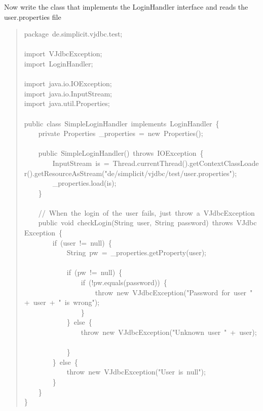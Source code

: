 \documentclass[10pt,a4paper,english]{article}
\begin{document}
Now write the class that implements the LoginHandler interface and reads the user.properties file
\begin{quote}{\ttfamily \raggedright \noindent
package~de.simplicit.vjdbc.test;~\\
~\\
import~VJdbcException;~\\
import~LoginHandler;~\\
~\\
import~java.io.IOException;~\\
import~java.io.InputStream;~\\
import~java.util.Properties;~\\
~\\
public~class~SimpleLoginHandler~implements~LoginHandler~{\{}~\\
~~~~private~Properties~{\_}properties~=~new~Properties();~\\
~\\
~~~~public~SimpleLoginHandler()~throws~IOException~{\{}~\\
~~~~~~~~InputStream~is~=~Thread.currentThread().getContextClassLoader().getResourceAsStream("de/simplicit/vjdbc/test/user.properties");~\\
~~~~~~~~{\_}properties.load(is);~\\
~~~~{\}}~\\
~\\
~~~~//~When~the~login~of~the~user~fails,~just~throw~a~VJdbcException~\\
~~~~public~void~checkLogin(String~user,~String~password)~throws~VJdbcException~{\{}~\\
~~~~~~~~if~(user~!=~null)~{\{}~\\
~~~~~~~~~~~~String~pw~=~{\_}properties.getProperty(user);~\\
~\\
~~~~~~~~~~~~if~(pw~!=~null)~{\{}~\\
~~~~~~~~~~~~~~~~if~(!pw.equals(password))~{\{}~\\
~~~~~~~~~~~~~~~~~~~~throw~new~VJdbcException("Password~for~user~"~+~user~+~"~is~wrong");~\\
~~~~~~~~~~~~~~~~{\}}~\\
~~~~~~~~~~~~{\}}~else~{\{}~\\
~~~~~~~~~~~~~~~~throw~new~VJdbcException("Unknown~user~"~+~user);~\\
~~~~~~~~~~~~{\}}~\\
~~~~~~~~{\}}~else~{\{}~\\
~~~~~~~~~~~~throw~new~VJdbcException("User~is~null");~\\
~~~~~~~~{\}}~\\
~~~~{\}}~\\
{\}}
}\end{quote}
\end{document}
